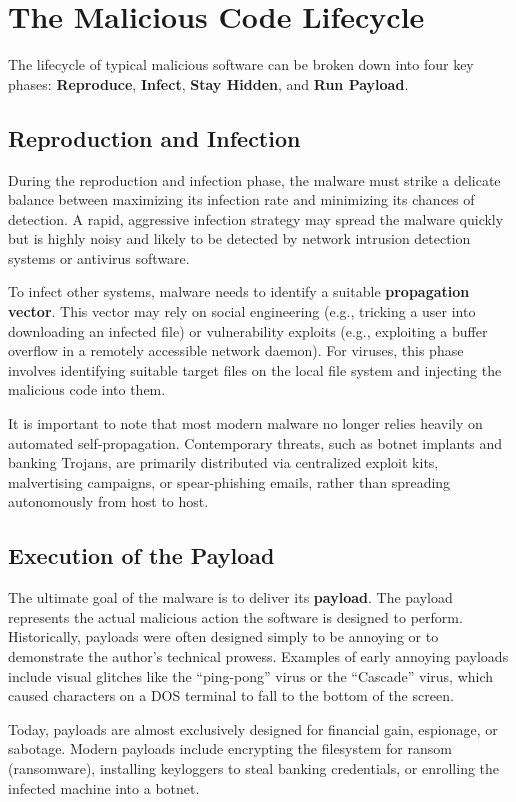 \section{The Malicious Code Lifecycle}
The lifecycle of typical malicious software can be broken down into four key phases: \textbf{Reproduce}, \textbf{Infect}, \textbf{Stay Hidden}, and \textbf{Run Payload}.

\subsection{Reproduction and Infection}
During the reproduction and infection phase, the malware must strike a delicate balance between maximizing its infection rate and minimizing its chances of detection. A rapid, aggressive infection strategy may spread the malware quickly but is highly noisy and likely to be detected by network intrusion detection systems or antivirus software. 

To infect other systems, malware needs to identify a suitable \textbf{propagation vector}. This vector may rely on social engineering (e.g., tricking a user into downloading an infected file) or vulnerability exploits (e.g., exploiting a buffer overflow in a remotely accessible network daemon). For viruses, this phase involves identifying suitable target files on the local file system and injecting the malicious code into them. 

It is important to note that most modern malware no longer relies heavily on automated self-propagation. Contemporary threats, such as botnet implants and banking Trojans, are primarily distributed via centralized exploit kits, malvertising campaigns, or spear-phishing emails, rather than spreading autonomously from host to host.

\subsection{Execution of the Payload}
The ultimate goal of the malware is to deliver its \textbf{payload}. The payload represents the actual malicious action the software is designed to perform. Historically, payloads were often designed simply to be annoying or to demonstrate the author's technical prowess. Examples of early annoying payloads include visual glitches like the ``ping-pong'' virus or the ``Cascade'' virus, which caused characters on a DOS terminal to fall to the bottom of the screen.

Today, payloads are almost exclusively designed for financial gain, espionage, or sabotage. Modern payloads include encrypting the filesystem for ransom (ransomware), installing keyloggers to steal banking credentials, or enrolling the infected machine into a botnet.


